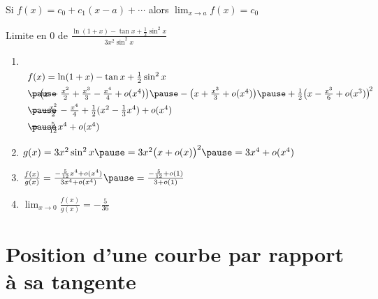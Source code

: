 \begin{frame}


Si \quad $f(x) = c_0+c_1(x-a)+\cdots$ \quad alors \quad $\lim_{x\to a} f(x) = c_0$

\pause

\begin{exemple}
Limite en $0$ de $\frac{\ln(1+x)-\tan x+\frac{1}{2}\sin^2x}{3x^2\sin^2x}$ 

\pause

\begin{enumerate}
  \item  \ \\ \vspace*{-3ex}
$\begin{array}{l@{\vrule depth 1.2ex height 3ex width 0mm }}
f(x)=\ln(1+x)-\tan x+\frac{1}{2}\sin^2x \\ \pause
\hspace*{-3em}=\!\big(x-\frac{x^2}{2}+\frac{x^3}{3}-\frac{x^4}{4}+o(x^4)\big)\pause
-\big(x+\frac{x^3}{3}+o(x^4)\big)\pause
 +\frac{1}{2}\big(x-\frac{x^3}{6}+o(x^3)\big)^{\!2} \\ \pause
\hspace*{-3em}=-\frac{x^2}{2}-\frac{x^4}{4}+\frac{1}{2}(x^2-\frac{1}{3}x^4)+o(x^4) \\ \pause
\hspace*{-3em}= -\frac{5}{12}x^4 + o(x^4)
\end{array}$
\pause
  \item $g(x)=3x^2\sin^2x\pause=3x^2\big(x+o(x)\big)^2 \pause=3x^4+o(x^4)$
\pause
  \item $\frac{f(x)}{g(x)}= \frac{-\frac{5}{12}x^4 + o(x^4)}{3x^4+o(x^4)} \pause = \frac{-\frac{5}{12} + o(1)}{3+o(1)}$
\pause
  \item $\lim_{x\to0}\frac{f(x)}{g(x)}=-\frac{5}{36}$
\end{enumerate}
\end{exemple}
  
\end{frame}



\section{Position d'une courbe par rapport à sa tangente}

